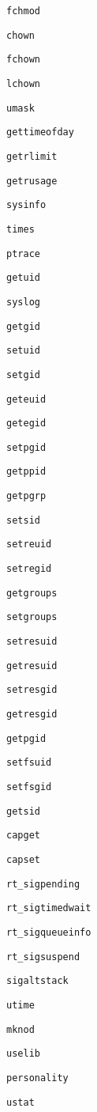 \verb+fchmod+

\verb+chown+

\verb+fchown+

\verb+lchown+

\verb+umask+

\verb+gettimeofday+

\verb+getrlimit+

\verb+getrusage+

\verb+sysinfo+

\verb+times+

\verb+ptrace+

\verb+getuid+

\verb+syslog+

\verb+getgid+

\verb+setuid+

\verb+setgid+

\verb+geteuid+

\verb+getegid+

\verb+setpgid+

\verb+getppid+

\verb+getpgrp+

\verb+setsid+

\verb+setreuid+

\verb+setregid+

\verb+getgroups+

\verb+setgroups+

\verb+setresuid+

\verb+getresuid+

\verb+setresgid+

\verb+getresgid+

\verb+getpgid+

\verb+setfsuid+

\verb+setfsgid+

\verb+getsid+

\verb+capget+

\verb+capset+

\verb+rt_sigpending+

\verb+rt_sigtimedwait+

\verb+rt_sigqueueinfo+

\verb+rt_sigsuspend+

\verb+sigaltstack+

\verb+utime+

\verb+mknod+

\verb+uselib+

\verb+personality+

\verb+ustat+

